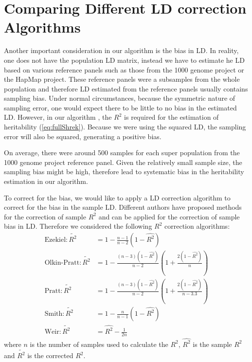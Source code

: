 	\section{Comparing Different LD correction Algorithms}
		\label{sec:ldSim}
		Another important consideration in our algorithm is the bias in \gls{LD}.
		In reality, one does not have the population \gls{LD} matrix, instead we have to estimate he \gls{LD} based on various reference panels such as those from the 1000 genome project\citep{Project2012} or the HapMap project\citep{Altshuler2010}.
		These reference panels were a subsamples from the whole population and therefore \gls{LD} estimated from the reference panels usually contains sampling bias.
		Under normal circumstances, because the symmetric nature of sampling error, one would expect there to be little to no bias in the estimated \gls{LD}.
		However, in our algorithm , the $R^2$ is required for the estimation of heritability (\cref{eq:fullShrek}).
		Because we were using the squared \gls{LD}, the sampling error will also be squared, generating a positive bias. 
		
		On average, there were around 500 samples for each super population from the 1000 genome project reference panel.
		Given the relatively small sample size, the sampling bias might be high, therefore lead to systematic bias in the heritability estimation in our algorithm.
		
		To correct for the bias, we would like to apply a \gls{LD} correction algorithm to correct for the bias in the sample \gls{LD}.
		Different authors \citep{Weir1980,Wang2007} have proposed methods for the correction of sample $R^2$ and can be applied for the correction of sample bias in \gls{LD}.
		Therefore we considered the following $R^2$ correction algorithms:
		\begin{align}
		\text{Ezekiel}: \tilde{R^2}&= 1-\frac{n-1}{n-2}(1-\hat{R^2})\label{eq:ezekiel} \\
		\text{Olkin-Pratt}: \tilde{R^2}&=1-\frac{(n-3)(1-\hat{R^2})}{n-2}(1+\frac{2(1-\hat{R^2})}{n})\label{eq:okin} \\
		\text{Pratt}: \tilde{R^2}&=1-\frac{(n-3)(1-\hat{R^2})}{n-2}(1+\frac{2(1-\hat{R^2})}{n-3.3})\label{eq:pratt} \\
		\text{Smith}: \tilde{R^2}&=1-\frac{n}{n-1}(1-\hat{R^2}) \label{eq:smith}\\
		\text{Weir}: \tilde{R^2}&=\hat{R^2}-\frac{1}{2n} \label{eq:weir}
		\end{align}
		where $n$ is the number of samples used to calculate the $R^2$, $\hat{R^2}$ is the sample $R^2$ and $\tilde{R^2}$ is the corrected $R^2$.
		

